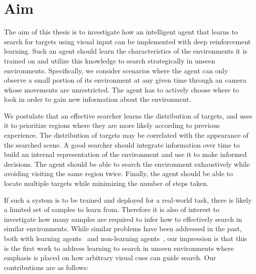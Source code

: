 \section{Aim}
\label{sec:aim}

The aim of this thesis is to investigate how an intelligent agent that learns to search for targets using visual input can be implemented with deep reinforcement learning.
Such an agent should learn the characteristics of the environments it is trained on and utilize this knowledge to search strategically in unseen environments.
Specifically, we consider scenarios where the agent can only observe a small portion of its environment at any given time through an camera whose movements are unrestricted.
The agent has to actively choose where to look in order to gain new information about the environment.

We postulate that an effective searcher learns the distribution of targets, and uses it to prioritize regions where they are more likely according to previous experience.
The distribution of targets may be correlated with the appearance of the searched scene.
A good searcher should integrate information over time to build an internal representation of the environment and use it to make informed decisions.
The agent should be able to search the environment exhaustively while avoiding visiting the same region twice.
Finally, the agent should be able to locate multiple targets while minimizing the number of steps taken.

If such a system is to be trained and deployed for a real-world task, there is likely a limited set of samples to learn from.
Therefore it is also of interest to investigate how many samples are required to infer how to effectively search in similar environments.
While similar problems have been addressed in the past, both with learning agents~\cite{minut_reinforcement_2001,mirowski_learning_2017,ourselin_artificial_2016,caicedo_active_2015} and non-learning agents~\cite{shubina_visual_2010,forssen_informed_2008}, 
our impression is that this is the first work to address learning to search in unseen environments where emphasis is placed on how arbitrary visual cues can guide search.
Our contributions are as follows:

